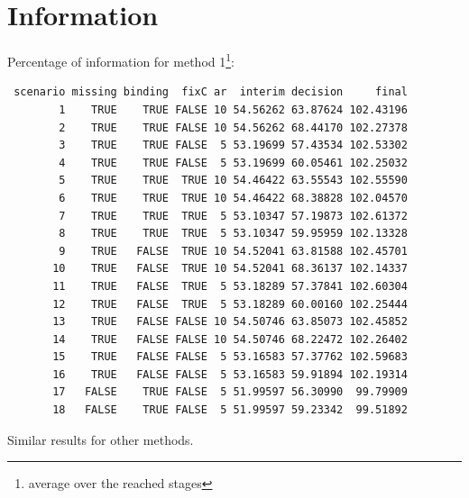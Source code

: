 \documentclass[12pt]{article}
\begin{document}
\clearpage

\section{Information}
\label{sec:orgd6ef13b}

Percentage of information for method 1\footnote{average over the reached stages}:
\begin{verbatim}
 scenario missing binding  fixC ar  interim decision     final
        1    TRUE    TRUE FALSE 10 54.56262 63.87624 102.43196
        2    TRUE    TRUE FALSE 10 54.56262 68.44170 102.27378
        3    TRUE    TRUE FALSE  5 53.19699 57.43534 102.53302
        4    TRUE    TRUE FALSE  5 53.19699 60.05461 102.25032
        5    TRUE    TRUE  TRUE 10 54.46422 63.55543 102.55590
        6    TRUE    TRUE  TRUE 10 54.46422 68.38828 102.04570
        7    TRUE    TRUE  TRUE  5 53.10347 57.19873 102.61372
        8    TRUE    TRUE  TRUE  5 53.10347 59.95959 102.13328
        9    TRUE   FALSE  TRUE 10 54.52041 63.81588 102.45701
       10    TRUE   FALSE  TRUE 10 54.52041 68.36137 102.14337
       11    TRUE   FALSE  TRUE  5 53.18289 57.37841 102.60304
       12    TRUE   FALSE  TRUE  5 53.18289 60.00160 102.25444
       13    TRUE   FALSE FALSE 10 54.50746 63.85073 102.45852
       14    TRUE   FALSE FALSE 10 54.50746 68.22472 102.26402
       15    TRUE   FALSE FALSE  5 53.16583 57.37762 102.59683
       16    TRUE   FALSE FALSE  5 53.16583 59.91894 102.19314
       17   FALSE    TRUE FALSE  5 51.99597 56.30990  99.79909
       18   FALSE    TRUE FALSE  5 51.99597 59.23342  99.51892
\end{verbatim}

Similar results for other methods.
\end{document}
